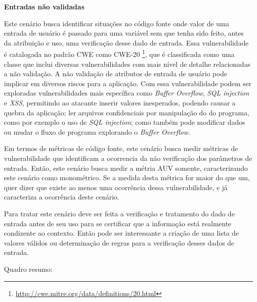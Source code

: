 %

\textbf{Entradas não validadas}

Este cenário busca identificar situações no código fonte onde valor de uma entrada de usuário é passado para uma variável sem que tenha sido feito, antes da atribuição e uso, uma verificação desse dado de entrada. Essa vulnerabilidade é catalogada no padrão CWE como CWE-20 \footnote{\url{http://cwe.mitre.org/data/definitions/20.html}}, que é classificada como uma classe que inclui diversas vulnerabilidades com mais nível de detalhe relacionadas a não validação. A não validação de atributos de entrada de usuário pode implicar em diversos riscos para a aplicação. Com essa vulnerabilidade podem ser exploradas vulnerabilidades  mais específica como \emph{Buffer Overflow}, \emph{SQL injection} e \emph{XSS}, permitindo ao atacante inserir valores inesperados, podendo causar a quebra da aplicação; ler arquivos confidenciais por manipulação do do programa, como por exemplo o uso de \emph{SQL injection}; como também pode modificar dados ou mudar o fluxo de programa explorando o \emph{Buffer Overflow}.

%

Em termos de métricas de código fonte, este cenário busca medir métricas de vulnerabilidade que identificam a ocorrencia da não verificação dos parâmetros de entrada. Então, este cenário busca medir a métria AUV somente, caracterizando este cenário como monométrico. Se a medida desta métrica for maior do que um, quer dizer que existe ao menos uma ocorrência dessa vulnerabilidade, e já caracteriza a ocorrência deste cenário.

%

Para tratar este cenário deve ser feita a verificação e tratamento do dado de entrada antes de seu uso para se certificar que a informação está realmente condizente ao contexto. Então pode ser interessante a criação de uma lista de valores válidos ou determinação de regras para a verificação desses dados de entrada.


Quadro resumo:

